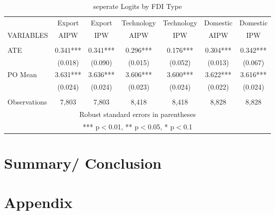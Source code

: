 \documentclass[a4paper,12pt]{scrartcl}
\newcommand{\sectionnumbering}[1]{%
  \setcounter{section}{0}%
   \renewcommand{\thesection}{\csname #1\endcsname{section}}}
\begin{document}
\begin{table}

  \centering
   \caption{seperate Logits by FDI Type} 
  \label{} 
 \begin{tabular}{lcccccc} \hline
 & Export   &Export  & Technology  &Technology  & Domestic  & Domestic  \\
VARIABLES & AIPW & IPW & AIPW & IPW & AIPW & IPW  \\ \hline
 &  &  &  &  &  &  \\
ATE  & 0.341*** & 0.341*** &   0.296*** &   0.176*** &   0.304*** &   0.342***   \\
 & (0.018) & (0.090) & (0.015) &   (0.052) &   (0.013) &   (0.067)   \\
PO Mean &3.631***&   3.636***   & 3.606***   & 3.600***   & 3.622*** &   3.616*** \\
 & (0.024) & (0.024) &   (0.023) &   (0.024) &   (0.022) &   (0.024) \\
 &  &  &  &  &  & \\
 Observations & 7,803  & 7,803&  8,418 & 8,418  &  8,828  & 8,828 \\ \hline
\multicolumn{7}{c}{ Robust standard errors in parentheses} \\
\multicolumn{7}{c}{ *** p$<$0.01, ** p$<$0.05, * p$<$0.1} \\
\end{tabular}
\end{table}



\section{Summary/ Conclusion}




\newpage






\section*{Appendix}
\sectionnumbering{Roman}
\setcounter{page}{3} %
\end{document}
